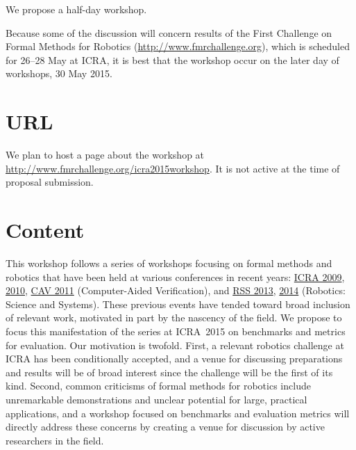 \documentclass{amsart}
\begin{document}
We propose a half-day workshop.

Because some of the discussion will concern results of the First Challenge on
Formal Methods for Robotics (\url{http://www.fmrchallenge.org}), which is
scheduled for 26--28 May at ICRA, it is best that the workshop occur on the
later day of workshops, 30 May 2015.

\section{URL}

We plan to host a page about the workshop at \url{http://www.fmrchallenge.org/icra2015workshop}.   It is not active at the time of proposal submission.


\section{Content}

This workshop follows a series of workshops focusing on formal methods and
robotics that have been held at various conferences in recent years:
\href{http://verifiablerobotics.com/ICRA09/index.html}{ICRA 2009},
\href{http://verifiablerobotics.com/ICRA10/index.html}{2010},
\href{http://verifiablerobotics.com/CAV11/index.html}{CAV 2011} (Computer-Aided
Verification), and \href{http://verifiablerobotics.com/RSS13/index.html}{RSS
  2013}, \href{http://verifiablerobotics.com/RSS14/index.html}{2014} (Robotics:
Science and Systems).  These previous events have tended toward broad inclusion
of relevant work, motivated in part by the nascency of the field.  We propose to
focus this manifestation of the series at ICRA~2015 on benchmarks and metrics for evaluation.
Our motivation is twofold.  First, a relevant robotics challenge at ICRA has
been conditionally accepted, and a venue for discussing preparations and results
will be of broad interest since the challenge will be the first of its kind.
Second, common criticisms of formal methods for robotics include unremarkable
demonstrations and unclear potential for large, practical applications, and a
workshop focused on benchmarks and evaluation metrics will directly address these concerns
by creating a venue for discussion by active researchers in the field.
\end{document}
